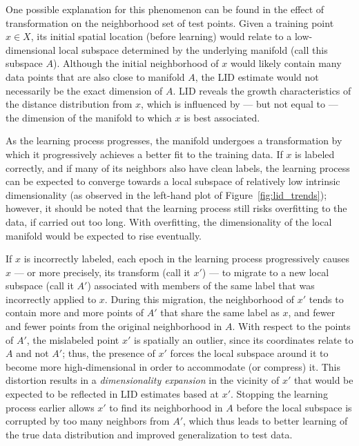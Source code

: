 \documentclass{article}
\begin{document}
One possible explanation for this phenomenon can be found in the effect of transformation on the neighborhood set of test points.
Given a training point $x\in X$, its initial spatial location (before learning) would relate to a low-dimensional local subspace determined by the underlying manifold (call this subspace $A$). 
Although the initial neighborhood of $x$ would likely contain many data points that are also close to manifold $A$, the LID estimate would not
necessarily be the exact dimension of $A$. LID reveals the growth characteristics of the distance distribution from $x$, which is influenced by --- but not equal to --- the dimension of the manifold to which $x$ is best associated.

As the learning process progresses, the manifold undergoes a transformation by which it progressively achieves a better fit to the training data. If $x$ is labeled correctly, and if many of its neighbors also have clean labels, the learning process can be expected to converge towards a local subspace of relatively low intrinsic dimensionality (as observed in the left-hand plot of Figure~\ref{fig:lid_trends}); however, it should be noted that the learning process still risks overfitting to the data, if carried out too long. With overfitting, the dimensionality of the local manifold would be expected to rise eventually.

If $x$ is incorrectly labeled, each epoch in the learning process progressively causes $x$ --- or more precisely, its transform (call it $x'$) --- to migrate to a new local subspace (call it $A'$) associated with members of the same label that was incorrectly applied to $x$. During this migration, the neighborhood of $x'$ tends to contain more and more points of $A'$ that share the same label as $x$, and fewer and fewer points from the original neighborhood in $A$. With respect to the points of $A'$, the mislabeled point $x'$ is spatially an outlier, since its coordinates relate to $A$ and not $A'$; thus, the presence of $x'$ forces the local subspace around it to become more high-dimensional in order to accommodate (or compress) it. This distortion results in a {\em dimensionality expansion} in the vicinity of $x'$ that would be expected to be reflected in LID estimates based at $x'$. Stopping the learning process earlier allows $x'$ to find its neighborhood in $A$ before the local subspace is corrupted by too many neighbors from $A'$, which thus leads to better learning of the true data distribution and improved generalization to test data.
\end{document}
